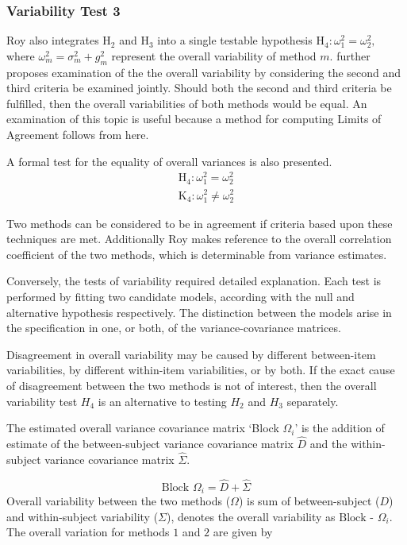 \documentclass[12pt, a4paper]{report}
\theoremstyle{plain}
\theoremstyle{definition}
\theoremstyle{remark}
\begin{document}
	
	\subsubsection{Variability Test 3}
	Roy also integrates $\mathrm{H}_2$ and $\mathrm{H}_3$ into a single testable hypothesis $\mathrm{H}_4\colon \omega^2_1=\omega^2_2,$ where $\omega^2_m = \sigma^2_m + g^2_m$ represent the overall variability of method $m.$ \citet{ARoy2009} further proposes examination of the the overall variability by considering the second and third criteria be examined jointly. Should both the second and third criteria be fulfilled, then the overall variabilities of both methods would be equal. An examination of this topic is useful because a method for computing Limits of Agreement follows from here.
	
	A formal test for the equality of overall variances is also presented.
	\begin{eqnarray*}
		\operatorname{H_4} : \omega^2_1 = \omega^2_2 \\
		\operatorname{K_4} : \omega^2_1 \neq \omega^2_2
	\end{eqnarray*}
	
	Two methods can be considered to be in agreement if criteria based upon these techniques are met. Additionally Roy makes reference to the overall correlation coefficient of the two methods, which is determinable from variance estimates.
	
	Conversely, the tests of variability required detailed explanation. Each test is performed by fitting two candidate models, according with the null and alternative hypothesis respectively. The distinction between the models arise in the specification in one, or both, of the variance-covariance matrices. %
	
	
	
	Disagreement in overall variability may be caused by different between-item variabilities, by different within-item variabilities, or by both.  If the exact cause of disagreement between the two methods is not of interest, then the overall variability test $H_4$ is an alternative to testing $H_2$ and $H_3$ separately.
	
	The estimated overall variance covariance matrix `Block
	$\Omega_{i}$' is the addition of estimate of the between-subject variance covariance matrix $\hat{D}$ and the within-subject variance covariance matrix $\hat{\Sigma}$.
	
	\begin{equation}
	\mbox{Block  }\Omega_{i} = \hat{D} + \hat{\Sigma}
	\end{equation}
	Overall variability between the two methods ($\Omega$) is sum of between-subject ($D$) and within-subject variability ($\Sigma$),
	\citet{ARoy2009} denotes the overall variability	as ${\mbox{Block - } \Omega_{i}}$. The overall variation for methods $1$ and $2$ are given by
	
\end{document}
